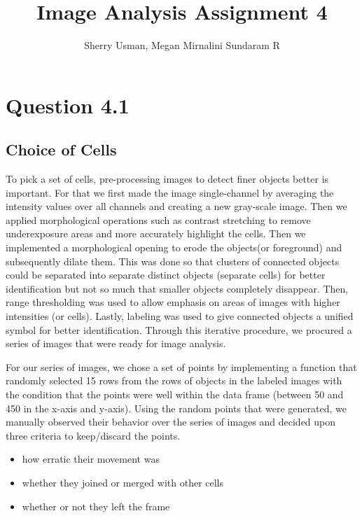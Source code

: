 \documentclass{article}
\title{Image Analysis Assignment 4}
\author{Sherry Usman, Megan Mirnalini Sundaram R}
\begin{document}
\maketitle

\section*{Question 4.1}
\subsection*{Choice of Cells}
\par To pick a set of cells, pre-processing images to detect finer objects better is important. For that we first made the image single-channel by averaging the intensity values over all channels and creating a new gray-scale image. Then we applied morphological operations such as contrast stretching to remove underexposure areas and more accurately highlight the cells. Then we implemented a morphological opening to erode the objects(or foreground) and subsequently dilate them. This was done so that clusters of connected objects could be separated into separate distinct objects (separate cells) for better identification but not so much that smaller objects completely disappear. Then, range thresholding was used to allow emphasis on areas of images with higher intensities (or cells). Lastly, labeling was used to give connected objects a unified symbol for better identification. Through this iterative procedure, we procured a series of images that were ready for image analysis.\newline 

\par For our series of images, we chose a set of points by implementing a function that randomly selected 15 rows from the rows of objects in the labeled images with the condition that the points were well within the data frame (between 50 and 450 in the x-axis and y-axis). Using the random points that were generated, we manually observed their behavior over the series of images and decided upon three criteria to keep/discard the points. 
\begin{itemize}
    \item how erratic their movement was
    \item whether they joined or merged with other cells
    \item whether or not they left the frame
\end{itemize}
\end{document}
